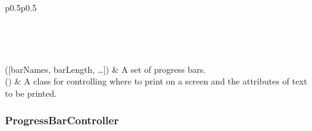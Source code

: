 \documentclass[a4paper,10pt,english]{sphinxmanual}
\begin{document}
\begin{savenotes}\sphinxatlongtablestart\begin{longtable}{p{0.5\linewidth}p{0.5\linewidth}}
\hline

\endfirsthead

%
{}\\
\hline

\endhead

\hline
{}\\
\endfoot

\endlastfoot

({[}barNames, barLength, …{]})
&
A set of progress bars.
\\
\hline
{}()
&
A class for controlling where to print on a screen and the attributes of text to be printed.
\\
\hline
\end{longtable}\sphinxatlongtableend\end{savenotes}


\subsubsection{ProgressBarController}
\label{\detokenize{api/termtools.terminal.ProgressBarController::doc}}\label{\detokenize{api/termtools.terminal.ProgressBarController:progressbarcontroller}}
\end{document}
